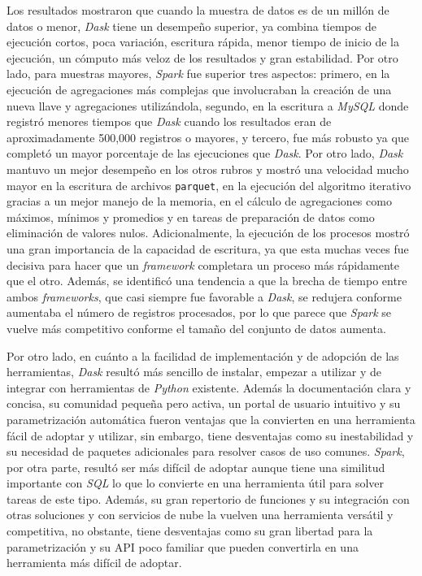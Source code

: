 \documentclass[11pt, oneside]{book}
\begin{document}
Los resultados mostraron que cuando la muestra de datos es de un millón de datos o menor, \textit{Dask} tiene un desempeño superior, ya combina tiempos de ejecución cortos, poca variación, 
escritura rápida, menor tiempo de inicio de la ejecución, un cómputo más veloz de los resultados y gran estabilidad. Por otro lado, para muestras mayores, \textit{Spark} fue superior tres aspectos: primero, en la ejecución de agregaciones más complejas que involucraban la creación de una nueva llave y agregaciones utilizándola, segundo, en la escritura a \textit{MySQL} donde registró menores tiempos que \textit{Dask} cuando los resultados eran de aproximadamente 500,000 registros o mayores, y tercero, fue más robusto ya que completó un mayor porcentaje de las ejecuciones que \textit{Dask}. Por otro lado, \textit{Dask} mantuvo un mejor desempeño en los otros rubros y mostró una velocidad mucho mayor en la escritura de archivos \texttt{parquet}, en la ejecución del algoritmo iterativo gracias a un mejor manejo de la memoria, en el cálculo de agregaciones como máximos, mínimos y promedios y en tareas de preparación de datos como eliminación de valores nulos. Adicionalmente, la ejecución de los procesos mostró una gran importancia de la capacidad de escritura, ya que esta muchas veces fue decisiva para hacer que un \textit{framework} completara un proceso más rápidamente que el otro. Además, se identificó una tendencia a que la brecha de tiempo entre ambos \textit{frameworks}, que casi siempre fue favorable a \textit{Dask}, se redujera conforme aumentaba el número de registros procesados, por lo que parece que \textit{Spark} se vuelve más competitivo conforme el tamaño del conjunto de datos aumenta.

Por otro lado, en cuánto a la facilidad de implementación y de adopción de las herramientas, \textit{Dask} resultó más sencillo de instalar, empezar a utilizar y de integrar con herramientas de \textit{Python} existente. Además la documentación clara y concisa, su comunidad pequeña pero activa, un portal de usuario intuitivo y su parametrización automática fueron ventajas que la convierten en una herramienta fácil de adoptar y utilizar, sin embargo, tiene desventajas como su inestabilidad y su necesidad de paquetes adicionales para resolver casos de uso comunes. \textit{Spark}, por otra parte, resultó ser más difícil de adoptar aunque tiene una similitud importante con \textit{SQL} lo que lo convierte en una herramienta útil para solver tareas de este tipo. Además, su gran repertorio de funciones y su integración con otras soluciones y con servicios de nube la vuelven una herramienta versátil y competitiva, no obstante, tiene desventajas como su gran libertad para la parametrización y su API poco familiar que pueden convertirla en una herramienta más difícil de adoptar.
\end{document}
